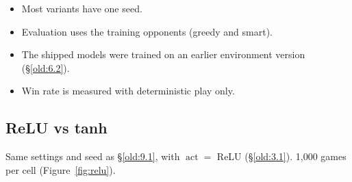 \begin{itemize}
\item Most variants have one seed.
\item Evaluation uses the training opponents (greedy and smart).
\item The shipped models were trained on an earlier environment version (\S\ref{old:6.2}).
\item Win rate is measured with deterministic play only.
\end{itemize}
\subsection{ReLU vs tanh}\label{old:9.4}

Same settings and seed as \S\ref{old:9.1}, with $\operatorname{act} = $ ReLU (\S\ref{old:3.1}). 1,000 games per cell (Figure~\ref{fig:relu}).


